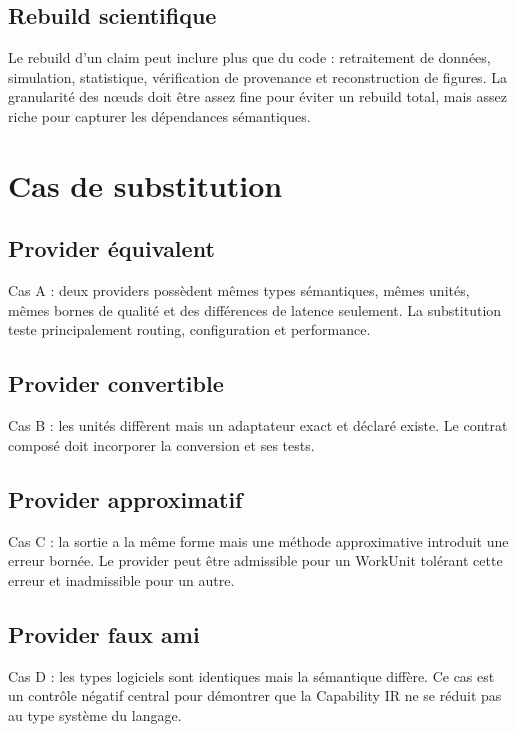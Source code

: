 \section{Rebuild scientifique}

Le rebuild d'un claim peut inclure plus que du code : retraitement de données, simulation, statistique, vérification de provenance et reconstruction de figures. La granularité des nœuds doit être assez fine pour éviter un rebuild total, mais assez riche pour capturer les dépendances sémantiques.

\chapter{Cas de substitution}

\section{Provider équivalent}

Cas A : deux providers possèdent mêmes types sémantiques, mêmes unités, mêmes bornes de qualité et des différences de latence seulement. La substitution teste principalement routing, configuration et performance.

\section{Provider convertible}

Cas B : les unités diffèrent mais un adaptateur exact et déclaré existe. Le contrat composé doit incorporer la conversion et ses tests.

\section{Provider approximatif}

Cas C : la sortie a la même forme mais une méthode approximative introduit une erreur bornée. Le provider peut être admissible pour un WorkUnit tolérant cette erreur et inadmissible pour un autre.

\section{Provider faux ami}

Cas D : les types logiciels sont identiques mais la sémantique diffère. Ce cas est un contrôle négatif central pour démontrer que la Capability IR ne se réduit pas au type système du langage.

